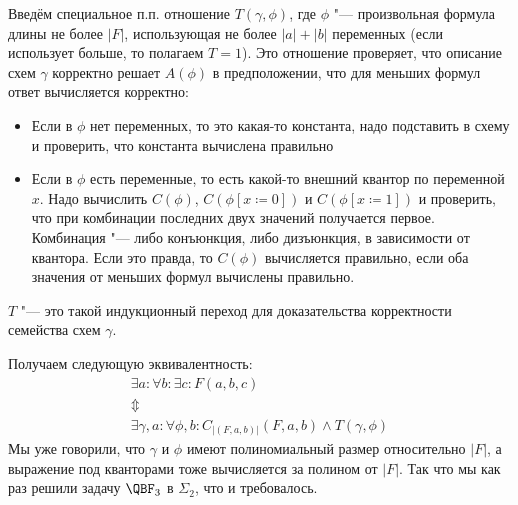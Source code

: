 	Введём специальное п.п. отношение $T(\gamma, \phi)$, где $\phi$ "--- произвольная формула длины не более $|F|$,
	использующая не более $|a|+|b|$ переменных (если использует больше, то полагаем $T=1$).
	Это отношение проверяет, что описание схем $\gamma$ корректно решает $A(\phi)$ в предположении,
	что для меньших формул ответ вычисляется корректно:
	\begin{itemize}
		\item Если в $\phi$ нет переменных, то это какая-то константа, надо подставить в схему и проверить, что константа вычислена правильно
		\item
			Если в $\phi$ есть переменные, то есть какой-то внешний квантор по переменной $x$.
			Надо вычислить $C(\phi)$, $C(\phi[x \coloneq 0])$ и $C(\phi[x \coloneq 1])$ и проверить, что
			при комбинации последних двух значений получается первое.
			Комбинация "--- либо конъюнкция, либо дизъюнкция, в зависимости от квантора.
			Если это правда, то $C(\phi)$ вычисляется правильно, если оба значения от меньших формул
			вычислены правильно.
	\end{itemize}
	\begin{Rem}
		$T$ "--- это такой индукционный переход для доказательства корректности семейства схем $\gamma$.
	\end{Rem}
	Получаем следующую эквивалентность:
	\begin{gather*}
		\exists a \colon \forall b \colon \exists c \colon F(a, b, c) \\
		\Updownarrow \\
		\exists \gamma, a \colon \forall \phi, b \colon C_{|(F, a, b)|}(F, a, b) \land T(\gamma, \phi)
 	\end{gather*}
 	Мы уже говорили, что $\gamma$ и $\phi$ имеют полиномиальный размер относительно $|F|$, а
 	выражение под кванторами тоже вычисляется за полином от $|F|$.
 	Так что мы как раз решили задачу $\QBF_3$ в $\Sigma_2$, что и требовалось.
